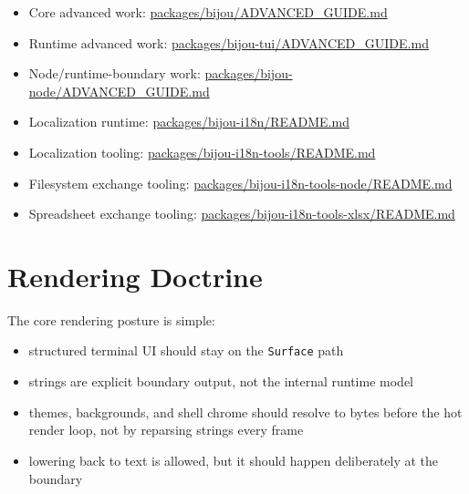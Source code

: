 \begin{itemize}
\tightlist
\item
  Core advanced work: \href{https://github.com/flyingrobots/bijou/blob/cbd70612140e7a450d764b3c7be1c6af878b99bc/packages/bijou/ADVANCED_GUIDE.md}{packages/bijou/ADVANCED\_GUIDE.md}
\item
  Runtime advanced work: \href{https://github.com/flyingrobots/bijou/blob/cbd70612140e7a450d764b3c7be1c6af878b99bc/packages/bijou-tui/ADVANCED_GUIDE.md}{packages/bijou-tui/ADVANCED\_GUIDE.md}
\item
  Node/runtime-boundary work: \href{https://github.com/flyingrobots/bijou/blob/cbd70612140e7a450d764b3c7be1c6af878b99bc/packages/bijou-node/ADVANCED_GUIDE.md}{packages/bijou-node/ADVANCED\_GUIDE.md}
\item
  Localization runtime: \href{https://github.com/flyingrobots/bijou/blob/cbd70612140e7a450d764b3c7be1c6af878b99bc/packages/bijou-i18n/README.md}{packages/bijou-i18n/README.md}
\item
  Localization tooling: \href{https://github.com/flyingrobots/bijou/blob/cbd70612140e7a450d764b3c7be1c6af878b99bc/packages/bijou-i18n-tools/README.md}{packages/bijou-i18n-tools/README.md}
\item
  Filesystem exchange tooling: \href{https://github.com/flyingrobots/bijou/blob/cbd70612140e7a450d764b3c7be1c6af878b99bc/packages/bijou-i18n-tools-node/README.md}{packages/bijou-i18n-tools-node/README.md}
\item
  Spreadsheet exchange tooling: \href{https://github.com/flyingrobots/bijou/blob/cbd70612140e7a450d764b3c7be1c6af878b99bc/packages/bijou-i18n-tools-xlsx/README.md}{packages/bijou-i18n-tools-xlsx/README.md}
\end{itemize}

\section{Rendering Doctrine}\label{record-001-rendering-doctrine}

The core rendering posture is simple:

\begin{itemize}
\tightlist
\item
  structured terminal UI should stay on the \texttt{S\allowbreak{}u\allowbreak{}r\allowbreak{}f\allowbreak{}a\allowbreak{}c\allowbreak{}e} path
\item
  strings are explicit boundary output, not the internal runtime model
\item
  themes, backgrounds, and shell chrome should resolve to bytes before the hot render loop, not by reparsing strings every frame
\item
  lowering back to text is allowed, but it should happen deliberately at the boundary
\end{itemize}

